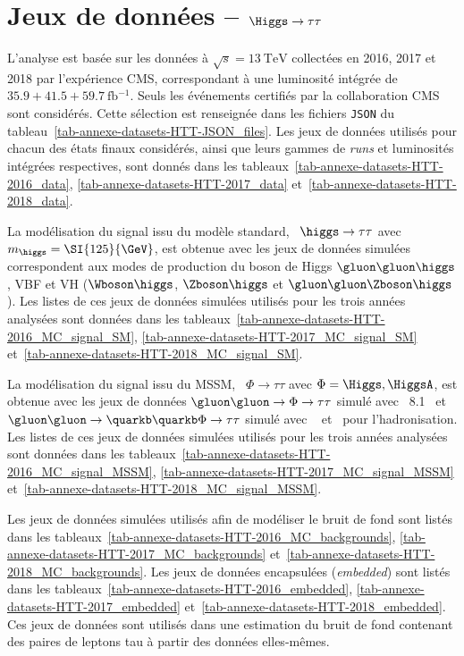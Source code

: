 \chapter{Jeux de données -- $\Higgs\to\tau\tau$}\label{annexe-datasets-HTT}
L'analyse est basée sur les données à $\sqrt{s}=\SI{13}{\TeV}$ collectées en 2016, 2017 et 2018 par l'expérience CMS, correspondant à une luminosité intégrée de $\num{35.9}+\num{41.5}+\SI{59.7}{\femto\barn^{-1}}$.
Seuls les événements certifiés par la collaboration CMS sont considérés. Cette sélection est renseignée dans les fichiers \texttt{JSON} du tableau~\ref{tab-annexe-datasets-HTT-JSON_files}.
Les jeux de données utilisés pour chacun des états finaux considérés, ainsi que leurs gammes de \emph{runs} et luminosités intégrées respectives, sont donnés dans les tableaux~\ref{tab-annexe-datasets-HTT-2016_data}, \ref{tab-annexe-datasets-HTT-2017_data} et~\ref{tab-annexe-datasets-HTT-2018_data}.
\par
La modélisation du signal issu du modèle standard,
\ie\ $\higgs\to\tau\tau$ avec $m_{\higgs}=\SI{125}{\GeV}$,
est obtenue avec les jeux de données simulées correspondent aux modes de production du boson de Higgs
$\gluon\gluon\higgs$,
VBF
et
VH ($\Wboson\higgs$, $\Zboson\higgs$ et $\gluon\gluon\Zboson\higgs$).
Les listes de ces jeux de données simulées utilisés pour les trois années analysées sont données dans les tableaux~\ref{tab-annexe-datasets-HTT-2016_MC_signal_SM}, \ref{tab-annexe-datasets-HTT-2017_MC_signal_SM} et~\ref{tab-annexe-datasets-HTT-2018_MC_signal_SM}.
\par
La modélisation du signal issu du MSSM,
\ie\ $\Phi\to\tau\tau$ avec $\Phi=\Higgs,\HiggsA$,
est obtenue avec les jeux de données
$\gluon\gluon\to\Phi\to\tau\tau$ simulé avec \PYTHIA~8.1~\cite{pythia8.1}
et
$\gluon\gluon\to\quarkb\quarkb\Phi\to\tau\tau$ simulé avec \AMCATNLO~\cite{amcatnlo} et \PYTHIA\ pour l'hadronisation.
Les listes de ces jeux de données simulées utilisés pour les trois années analysées sont données dans les tableaux~\ref{tab-annexe-datasets-HTT-2016_MC_signal_MSSM}, \ref{tab-annexe-datasets-HTT-2017_MC_signal_MSSM} et~\ref{tab-annexe-datasets-HTT-2018_MC_signal_MSSM}.
\par
Les jeux de données simulées utilisés afin de modéliser le bruit de fond sont listés dans les tableaux~\ref{tab-annexe-datasets-HTT-2016_MC_backgrounds}, \ref{tab-annexe-datasets-HTT-2017_MC_backgrounds} et~\ref{tab-annexe-datasets-HTT-2018_MC_backgrounds}.
Les jeux de données encapsulées (\emph{embedded}) sont listés dans les tableaux~\ref{tab-annexe-datasets-HTT-2016_embedded}, \ref{tab-annexe-datasets-HTT-2017_embedded} et~\ref{tab-annexe-datasets-HTT-2018_embedded}.
Ces jeux de données sont utilisés dans une estimation du bruit de fond contenant des paires de leptons tau à partir des données elles-mêmes.


